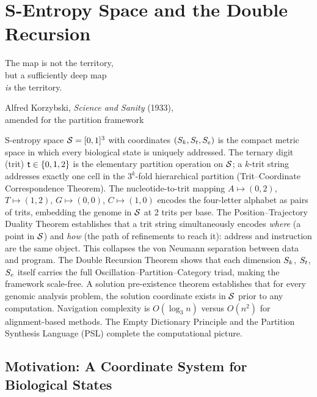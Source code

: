 
\chapter{S-Entropy Space and the Double Recursion}
\label{chap:sentropy_space}

\epigraph{%
  The map is not the territory,\\
  but a sufficiently deep map\\
  \emph{is} the territory.%
}{Alfred Korzybski, \textit{Science and Sanity} (1933),\\
  amended for the partition framework}

\begin{chapterbox}
S-entropy space $\mathcal{S} = [0,1]^3$ with coordinates $(S_k, S_t, S_e)$
is the compact metric space in which every biological state is uniquely
addressed. The ternary digit (trit) $\mathsf{t} \in \{0,1,2\}$ is the elementary
partition operation on $\mathcal{S}$; a $k$-trit string addresses exactly one
cell in the $3^k$-fold hierarchical partition (Trit--Coordinate Correspondence
Theorem). The nucleotide-to-trit mapping $A \mapsto (0,2)$, $T \mapsto (1,2)$,
$G \mapsto (0,0)$, $C \mapsto (1,0)$ encodes the four-letter alphabet as pairs
of trits, embedding the genome in $\mathcal{S}$ at 2 trits per base.
The Position--Trajectory Duality Theorem establishes that a trit string
simultaneously encodes \emph{where} (a point in $\mathcal{S}$) and \emph{how}
(the path of refinements to reach it): address and instruction are the same
object. This collapses the von Neumann separation between data and program.
The Double Recursion Theorem shows that each dimension $S_k$, $S_t$, $S_e$
itself carries the full Oscillation--Partition--Category triad, making the
framework scale-free. A solution pre-existence theorem establishes that for
every genomic analysis problem, the solution coordinate exists in $\mathcal{S}$
prior to any computation. Navigation complexity is $O(\log_3 n)$ versus
$O(n^2)$ for alignment-based methods. The Empty Dictionary Principle and the
Partition Synthesis Language (PSL) complete the computational picture.
\end{chapterbox}

\section{Motivation: A Coordinate System for Biological States}
\label{sec:sentropy_motivation}

